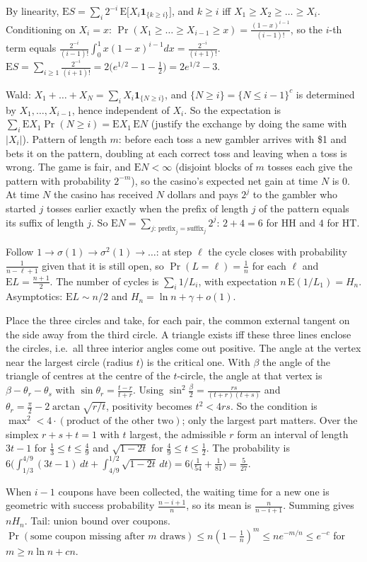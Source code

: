 \documentclass[11pt,a4paper]{article}
\begin{document}
 By linearity, $\mathrm{E}S=\sum_i2^{-i}\,\mathrm{E}\bigl[X_i\mathbf 1_{\{k\ge i\}}\bigr]$, and $k\ge i$ iff $X_1\ge X_2\ge\dots\ge X_i$.
 Conditioning on $X_i=x$: $\Pr(X_1\ge\dots\ge X_{i-1}\ge x)=\frac{(1-x)^{i-1}}{(i-1)!}$, so the $i$-th term equals $\frac{2^{-i}}{(i-1)!}\int_0^1x(1-x)^{i-1}dx=\frac{2^{-i}}{(i+1)!}$.
 $\mathrm{E}S=\sum_{i\ge1}\frac{2^{-i}}{(i+1)!}=2\bigl(e^{1/2}-1-\tfrac12\bigr)=2e^{1/2}-3$.

 Wald: $X_1+\dots+X_N=\sum_iX_i\mathbf 1_{\{N\ge i\}}$, and $\{N\ge i\}=\{N\le i-1\}^c$ is determined by $X_1,\dots,X_{i-1}$, hence independent of $X_i$. So the expectation is $\sum_i\mathrm{E}X_1\Pr(N\ge i)=\mathrm{E}X_1\,\mathrm{E}N$ (justify the exchange by doing the same with $|X_i|$).
 Pattern of length $m$: before each toss a new gambler arrives with \$1 and bets it on the pattern, doubling at each correct toss and leaving when a toss is wrong. The game is fair, and $\mathrm{E}N<\infty$ (disjoint blocks of $m$ tosses each give the pattern with probability $2^{-m}$), so the casino's expected net gain at time $N$ is $0$.
 At time $N$ the casino has received $N$ dollars and pays $2^j$ to the gambler who started $j$ tosses earlier exactly when the prefix of length $j$ of the pattern equals its suffix of length $j$. So $\mathrm{E}N=\sum_{j:\,\text{prefix}_j=\text{suffix}_j}2^j$: $2+4=6$ for HH and $4$ for HT.

 Follow $1\to\sigma(1)\to\sigma^2(1)\to\dots$: at step $\ell$ the cycle closes with probability $\frac1{n-\ell+1}$ given that it is still open, so $\Pr(L=\ell)=\frac1n$ for each $\ell$ and $\mathrm{E}L=\frac{n+1}2$.
 The number of cycles is $\sum_i1/L_i$, with expectation $n\,\mathrm{E}(1/L_1)=H_n$. Asymptotics: $\mathrm{E}L\sim n/2$ and $H_n=\ln n+\gamma+o(1)$.

 Place the three circles and take, for each pair, the common external tangent on the side away from the third circle. A triangle exists iff these three lines enclose the circles, i.e.\ all three interior angles come out positive. The angle at the vertex near the largest circle (radius $t$) is the critical one.
 With $\beta$ the angle of the triangle of centres at the centre of the $t$-circle, the angle at that vertex is $\beta-\theta_r-\theta_s$ with $\sin\theta_r=\frac{t-r}{t+r}$. Using $\sin^2\frac\beta2=\frac{rs}{(t+r)(t+s)}$ and $\theta_r=\frac\pi2-2\arctan\sqrt{r/t}$, positivity becomes $t^2<4rs$.
 So the condition is $\max^2<4\cdot(\text{product of the other two})$; only the largest part matters. Over the simplex $r+s+t=1$ with $t$ largest, the admissible $r$ form an interval of length $3t-1$ for $\frac13\le t\le\frac49$ and $\sqrt{1-2t}$ for $\frac49\le t\le\frac12$. The probability is $6\bigl(\int_{1/3}^{4/9}(3t-1)\,dt+\int_{4/9}^{1/2}\sqrt{1-2t}\,dt\bigr)=6\bigl(\frac1{54}+\frac1{81}\bigr)=\frac5{27}$.

 When $i-1$ coupons have been collected, the waiting time for a new one is geometric with success probability $\frac{n-i+1}n$, so its mean is $\frac n{n-i+1}$. Summing gives $nH_n$.
 Tail: union bound over coupons. $\Pr(\text{some coupon missing after }m\text{ draws})\le n(1-\frac1n)^m\le ne^{-m/n}\le e^{-c}$ for $m\ge n\ln n+cn$.
\end{document}
